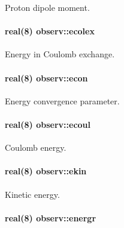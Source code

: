 Proton dipole moment. 

\paragraph[{\texorpdfstring{ecolex}{ecolex}}]{\setlength{\rightskip}{0pt plus 5cm}real(8) observ\+::ecolex}\hypertarget{namespaceobserv_a6331b57c0ae11428cdfa449797aa09d2}{}\label{namespaceobserv_a6331b57c0ae11428cdfa449797aa09d2}


Energy in Coulomb exchange. 

\paragraph[{\texorpdfstring{econ}{econ}}]{\setlength{\rightskip}{0pt plus 5cm}real(8) observ\+::econ}\hypertarget{namespaceobserv_aab2b361228c2be9aacc647898d20602c}{}\label{namespaceobserv_aab2b361228c2be9aacc647898d20602c}


Energy convergence parameter. 

\paragraph[{\texorpdfstring{ecoul}{ecoul}}]{\setlength{\rightskip}{0pt plus 5cm}real(8) observ\+::ecoul}\hypertarget{namespaceobserv_ac0a63f15b5c3dd97c7869b7748679212}{}\label{namespaceobserv_ac0a63f15b5c3dd97c7869b7748679212}


Coulomb energy. 

\paragraph[{\texorpdfstring{ekin}{ekin}}]{\setlength{\rightskip}{0pt plus 5cm}real(8) observ\+::ekin}\hypertarget{namespaceobserv_a7df2eeed60a05d3f29ca04013bba2081}{}\label{namespaceobserv_a7df2eeed60a05d3f29ca04013bba2081}


Kinetic energy. 

\paragraph[{\texorpdfstring{energr}{energr}}]{\setlength{\rightskip}{0pt plus 5cm}real(8) observ\+::energr}\hypertarget{namespaceobserv_a8e556cf28d2d577177523975fb47467b}{}\label{namespaceobserv_a8e556cf28d2d577177523975fb47467b}


